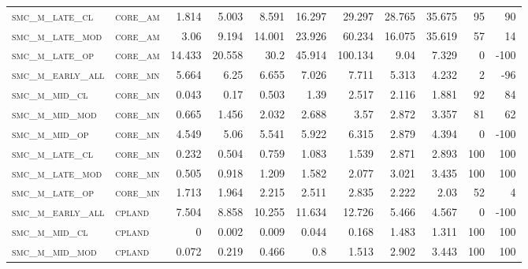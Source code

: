 \begin{landscape}
\begin{center}
\begin{footnotesize}
\begin{longtable}{llrrrrrr|rrr}
\textsc{smc\_m\_late\_cl  } & \textsc{core\_am  }   & 1.814    & 5.003    & 8.591    & 16.297   & 29.297   & 28.765      & 35.675        & 95            & 90       \\
\textsc{smc\_m\_late\_mod } & \textsc{core\_am  }   & 3.06     & 9.194    & 14.001   & 23.926   & 60.234   & 16.075      & 35.619        & 57            & 14       \\
\textsc{smc\_m\_late\_op  } & \textsc{core\_am  }   & 14.433   & 20.558   & 30.2     & 45.914   & 100.134  & 9.04        & 7.329         & 0             & -100     \\
\textsc{smc\_m\_early\_all} & \textsc{core\_mn  }   & 5.664    & 6.25     & 6.655    & 7.026    & 7.711    & 5.313       & 4.232         & 2             & -96      \\
\textsc{smc\_m\_mid\_cl   } & \textsc{core\_mn  }   & 0.043    & 0.17     & 0.503    & 1.39     & 2.517    & 2.116       & 1.881         & 92            & 84       \\
\textsc{smc\_m\_mid\_mod  } & \textsc{core\_mn  }   & 0.665    & 1.456    & 2.032    & 2.688    & 3.57     & 2.872       & 3.357         & 81            & 62       \\
\textsc{smc\_m\_mid\_op   } & \textsc{core\_mn  }   & 4.549    & 5.06     & 5.541    & 5.922    & 6.315    & 2.879       & 4.394         & 0             & -100     \\
\textsc{smc\_m\_late\_cl  } & \textsc{core\_mn  }   & 0.232    & 0.504    & 0.759    & 1.083    & 1.539    & 2.871       & 2.893         & 100           & 100      \\
\textsc{smc\_m\_late\_mod } & \textsc{core\_mn  }   & 0.505    & 0.918    & 1.209    & 1.582    & 2.077    & 3.021       & 3.435         & 100           & 100      \\
\textsc{smc\_m\_late\_op  } & \textsc{core\_mn  }   & 1.713    & 1.964    & 2.215    & 2.511    & 2.835    & 2.222       & 2.03          & 52            & 4        \\
\textsc{smc\_m\_early\_all} & \textsc{cpland    }   & 7.504    & 8.858    & 10.255   & 11.634   & 12.726   & 5.466       & 4.567         & 0             & -100     \\
\textsc{smc\_m\_mid\_cl   } & \textsc{cpland    }   & 0        & 0.002    & 0.009    & 0.044    & 0.168    & 1.483       & 1.311         & 100           & 100      \\
\textsc{smc\_m\_mid\_mod  } & \textsc{cpland    }   & 0.072    & 0.219    & 0.466    & 0.8      & 1.513    & 2.902       & 3.443         & 100           & 100      \\

\end{longtable}
\end{footnotesize}
\end{center}
\end{landscape}
